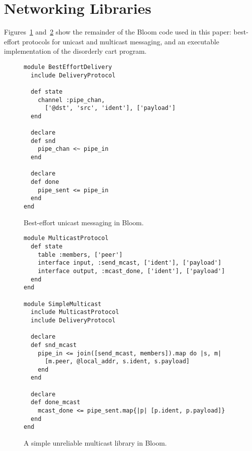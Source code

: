 \section{Networking Libraries}
Figures~\ref{fig:delivery-impl} and~\ref{fig:multicast-impl} show the remainder
of the Bloom code used in this paper: best-effort protocols for unicast and
multicast messaging, and an executable implementation of the disorderly cart 
program.

\label{app:network-code}

\begin{figure}[h]
\begin{scriptsize}
\begin{lstlisting}
module BestEffortDelivery
  include DeliveryProtocol

  def state
    channel :pipe_chan,
      ['@dst', 'src', 'ident'], ['payload']
  end

  declare
  def snd
    pipe_chan <~ pipe_in
  end

  declare
  def done
    pipe_sent <= pipe_in
  end
end
\end{lstlisting}
\centering
\vspace{-10pt}
\caption{Best-effort unicast messaging in Bloom.}
\label{fig:delivery-impl}
\end{scriptsize}
\vspace{-2pt}
\end{figure}


\begin{figure}[h]
\begin{scriptsize}
\begin{lstlisting}
module MulticastProtocol
  def state
    table :members, ['peer']
    interface input, :send_mcast, ['ident'], ['payload']
    interface output, :mcast_done, ['ident'], ['payload']
  end
end

module SimpleMulticast
  include MulticastProtocol
  include DeliveryProtocol

  declare
  def snd_mcast
    pipe_in <= join([send_mcast, members]).map do |s, m|
      [m.peer, @local_addr, s.ident, s.payload]
    end
  end

  declare
  def done_mcast
    mcast_done <= pipe_sent.map{|p| [p.ident, p.payload]}
  end
end
\end{lstlisting}
\centering
\vspace{-10pt}
\caption{A simple unreliable multicast library in Bloom.}
\label{fig:multicast-impl}
\end{scriptsize}
\vspace{-2pt}
\end{figure}


